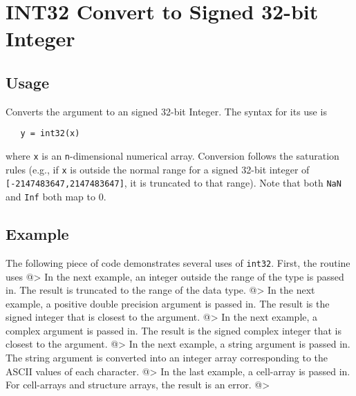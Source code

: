 \section{INT32 Convert to Signed 32-bit Integer}

\subsection{Usage}

Converts the argument to an signed 32-bit Integer.  The syntax
for its use is
\begin{verbatim}
   y = int32(x)
\end{verbatim}
where \verb|x| is an \verb|n|-dimensional numerical array.  Conversion
follows the saturation rules (e.g., if \verb|x| is outside the normal
range for a signed 32-bit integer of \verb|[-2147483647,2147483647]|, 
it is truncated to that range).  Note that both \verb|NaN| and \verb|Inf| both map to 0.
\subsection{Example}

The following piece of code demonstrates several uses of \verb|int32|.  First, the routine uses
@>
In the next example, an integer outside the range  of the type is passed in.  The 
result is truncated to the range of the data type.
@>
In the next example, a positive double precision argument is passed in.  The 
result is the signed integer that is closest to the argument.
@>
In the next example, a complex argument is passed in.  The result is the signed 
complex integer that is closest to the argument.
@>
In the next example, a string argument is passed in.  The string argument is 
converted into an integer array corresponding to the ASCII values of each character.
@>
In the last example, a cell-array is passed in.  For cell-arrays and structure 
arrays, the result is an error.
@>
